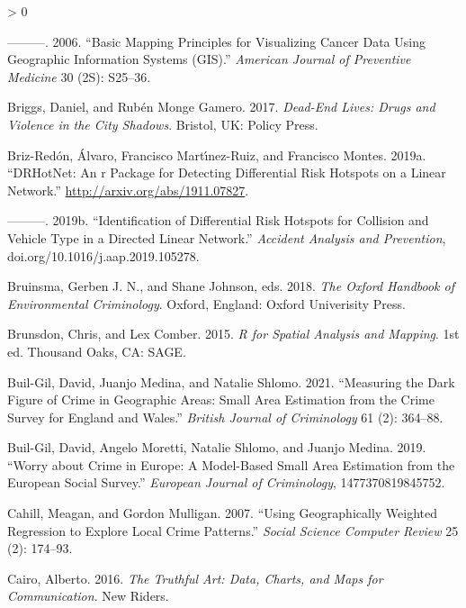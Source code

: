 \documentclass[
  krantz2]{krantz}
\newlength{\cslhangindent}
\newenvironment{CSLReferences}[2] %
 {%
  \setlength{\parindent}{0pt}
  \ifodd #1 \everypar{\setlength{\hangindent}{\cslhangindent}}\ignorespaces\fi
  \ifnum #2 > 0
  \setlength{\parskip}{#2\baselineskip}
  \fi
 }%
 {}
\begin{document}
\begin{CSLReferences}{1}{0}
\leavevmode\hypertarget{ref-Brewer_2006}{}%
---------. 2006. {``Basic Mapping Principles for Visualizing Cancer Data Using Geographic Information Systems (GIS).''} \emph{American Journal of Preventive Medicine} 30 (2S): S25--36.

\leavevmode\hypertarget{ref-Briggs_2017}{}%
Briggs, Daniel, and Rubén Monge Gamero. 2017. \emph{Dead-End Lives: Drugs and Violence in the City Shadows}. Bristol, UK: Policy Press.

\leavevmode\hypertarget{ref-BrizRedon_2019a}{}%
Briz-Redón, Álvaro, Francisco Martı́nez-Ruiz, and Francisco Montes. 2019a. {``DRHotNet: An r Package for Detecting Differential Risk Hotspots on a Linear Network.''} \url{http://arxiv.org/abs/1911.07827}.

\leavevmode\hypertarget{ref-BrizRedon_2019b}{}%
---------. 2019b. {``Identification of Differential Risk Hotspots for Collision and Vehicle Type in a Directed Linear Network.''} \emph{Accident Analysis and Prevention}, doi.org/10.1016/j.aap.2019.105278.

\leavevmode\hypertarget{ref-Bruinsma_2018}{}%
Bruinsma, Gerben J. N., and Shane Johnson, eds. 2018. \emph{The Oxford Handbook of Environmental Criminology}. Oxford, England: Oxford Univerisity Press.

\leavevmode\hypertarget{ref-Brunsdon_2015}{}%
Brunsdon, Chris, and Lex Comber. 2015. \emph{R for Spatial Analysis and Mapping}. 1st ed. Thousand Oaks, CA: SAGE.

\leavevmode\hypertarget{ref-Buil-Gil_2021}{}%
Buil-Gil, David, Juanjo Medina, and Natalie Shlomo. 2021. {``Measuring the Dark Figure of Crime in Geographic Areas: Small Area Estimation from the Crime Survey for England and Wales.''} \emph{British Journal of Criminology} 61 (2): 364--88.

\leavevmode\hypertarget{ref-Buil_2019}{}%
Buil-Gil, David, Angelo Moretti, Natalie Shlomo, and Juanjo Medina. 2019. {``Worry about Crime in Europe: A Model-Based Small Area Estimation from the European Social Survey.''} \emph{European Journal of Criminology}, 1477370819845752.

\leavevmode\hypertarget{ref-Cahill_2007}{}%
Cahill, Meagan, and Gordon Mulligan. 2007. {``Using Geographically Weighted Regression to Explore Local Crime Patterns.''} \emph{Social Science Computer Review} 25 (2): 174--93.

\leavevmode\hypertarget{ref-Cairo_2016}{}%
Cairo, Alberto. 2016. \emph{The Truthful Art: Data, Charts, and Maps for Communication}. New Riders.


\end{CSLReferences}
\end{document}
